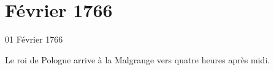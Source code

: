                   \chapter*{Février 1766}
                     
                     

                     \begin{diary}{01 Février 1766}{}
                        
                        
                           Le roi de Pologne arrive à
                              la Malgrange
                           vers quatre heures après midi. \bigskip
        
        
                     \end{diary}

